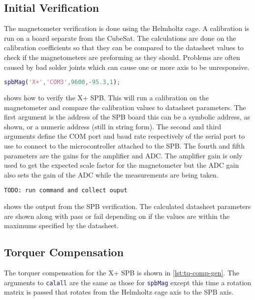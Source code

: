 \subsection{Initial Verification}

The magnetometer verification is done using the Helmholtz cage. A calibration is run on a board separate from the CubeSat. The calculations are done on the calibration coefficients so that they can be compared to the datasheet values to check if the magnetometers are preforming as they should. Problems are often caused by bad solder joints which can cause one or more axis to be unresponsive.

\begin{lstlisting}[style=code,caption={\ac{SPB} verification},label={lst:vspb},language=Matlab]
spbMag('X+','COM3',9600,-95.3,1);
\end{lstlisting}

 shows how to verify the X+ \ac{SPB}. This will run a calibration on the magnetometer and compare the calibration values to datasheet parameters. The first argument is the address of the \ac{SPB} board this can be a symbolic address, as shown, or a numeric address (still in string form). The second and third arguments define the COM port and baud rate respectively of the serial port to use to connect to the microcontroller attached to the \ac{SPB}. The fourth and fifth parameters are the gains for the amplifier and \ac{ADC}. The amplifier gain is only used to get the expected scale factor for the magnetometer but the \ac{ADC} gain also sets the gain of the \ac{ADC} while the measurements are being taken.

\begin{lstlisting}[caption={\ac{SPB} verification results},label={lst:vspb-res},language=verbatim]
TODO: run command and collect ouput
\end{lstlisting}

 shows the output from the \ac{SPB} verification. The calculated datasheet parameters are shown along with pass or fail depending on if the values are within the maximums specified by the datasheet.


\subsection{Torquer Compensation}

\label{sec:tq-comp}

The torquer compensation for the X+ \ac{SPB} is shown in \cref{lst:tq-comp-gen}. The arguments to \lstinline[style=code,language=Matlab]$calall$ are the same as those for \lstinline[style=code,language=Matlab]$spbMag$ except this time a rotation matrix is passed that rotates from the Helmholtz cage axis to the \ac{SPB} axis.


